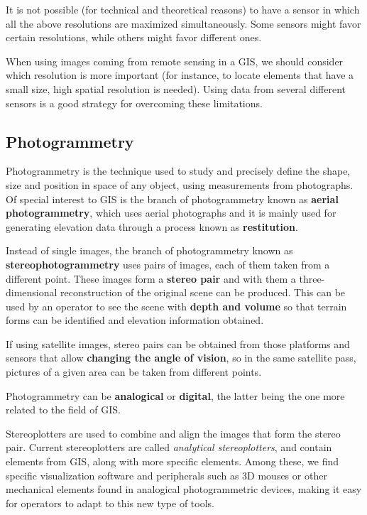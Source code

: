 It is not possible (for technical and theoretical reasons) to have a sensor in which all the above resolutions are maximized simultaneously. Some sensors might favor certain resolutions, while others might favor different ones.

When using images coming from remote sensing in a GIS, we should consider which resolution is more important (for instance, to locate elements that have a small size, high spatial resolution is needed). Using data from several different sensors is a good strategy for overcoming these limitations.


\subsection{Photogrammetry}

Photogrammetry is the technique used to study and precisely define the shape, size and position in space of any object, using measurements from photographs. Of special interest to GIS is the branch of photogrammetry known as \textbf{aerial photogrammetry}, which uses aerial photographs and it is mainly used for generating elevation data through a process known as \textbf{restitution}.

Instead of single images, the branch of photogrammetry known as \textbf{stereophotogrammetry} uses pairs of images, each of them taken from a different point. These images form a \textbf{stereo pair} and with them a three-dimensional reconstruction of the original scene can be produced. This can be used by an operator to see the scene with \textbf{depth and volume} so that terrain forms can be identified and elevation information obtained. 

If using satellite images, stereo pairs can be obtained from those platforms and sensors that allow \textbf{changing the angle of vision}, so in the same satellite pass, pictures of a given area can be taken from different points.

Photogrammetry can be \textbf{analogical} or \textbf{digital}, the latter being the one more related to the field of GIS.

Stereoplotters are used to combine and align the images that form the stereo pair. Current stereoplotters are called \emph{analytical stereoplotters}, and contain elements from GIS, along with more specific elements. Among these, we find specific visualization software and peripherals such as 3D mouses or other mechanical elements found in analogical photogrammetric devices, making it easy for operators to adapt to this new type of tools.

